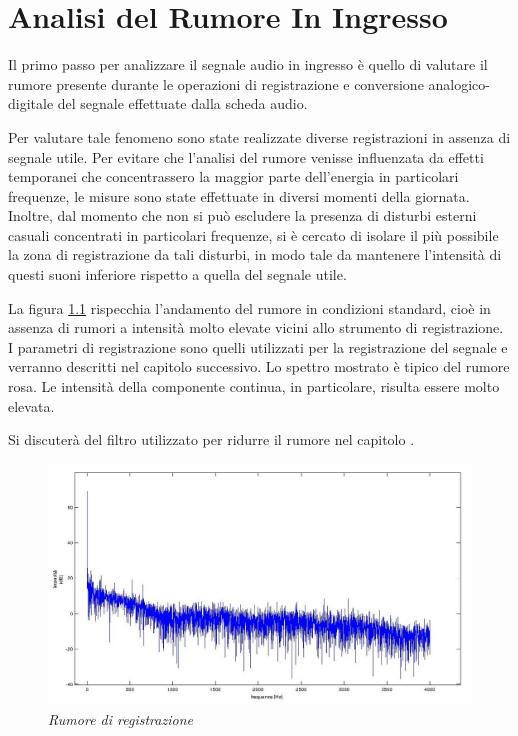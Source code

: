 \chapter{Analisi del Rumore In Ingresso}\label{cap:rumore}

Il primo passo per analizzare il segnale audio in ingresso è quello di valutare il rumore presente durante le operazioni di registrazione e conversione analogico-digitale del segnale effettuate dalla scheda audio. 

Per valutare tale fenomeno sono state realizzate diverse registrazioni in assenza di segnale utile. 
Per evitare che l'analisi del rumore venisse influenzata da effetti temporanei che concentrassero la maggior parte dell'energia in particolari frequenze, le misure sono state effettuate in diversi momenti della giornata.
Inoltre, dal momento che non si può escludere la presenza di disturbi esterni casuali concentrati in particolari frequenze, si è cercato di isolare il più possibile la zona di registrazione da tali disturbi, in modo tale da mantenere l'intensità di questi suoni inferiore rispetto a quella del segnale utile.
 
La figura \ref{fig:rumore} rispecchia l'andamento del rumore in condizioni standard, cioè in assenza di rumori a intensità molto elevate vicini allo strumento di registrazione. 
I parametri di registrazione sono quelli utilizzati per la registrazione del segnale e verranno descritti nel capitolo successivo.
Lo spettro mostrato è tipico del rumore rosa. 
Le intensità della componente continua, in particolare, risulta essere molto elevata.

Si discuterà del filtro utilizzato per ridurre il rumore nel capitolo .

	\begin{figure}[h]
	  \begin{center} 
	    \includegraphics[width=\textwidth*\real{0.9}]{images/ch_02/spettro_rumore.jpg}
	  \end{center} 
	  \caption{\textit{Rumore di registrazione}}  
	  \label{fig:rumore}
	\end{figure}



